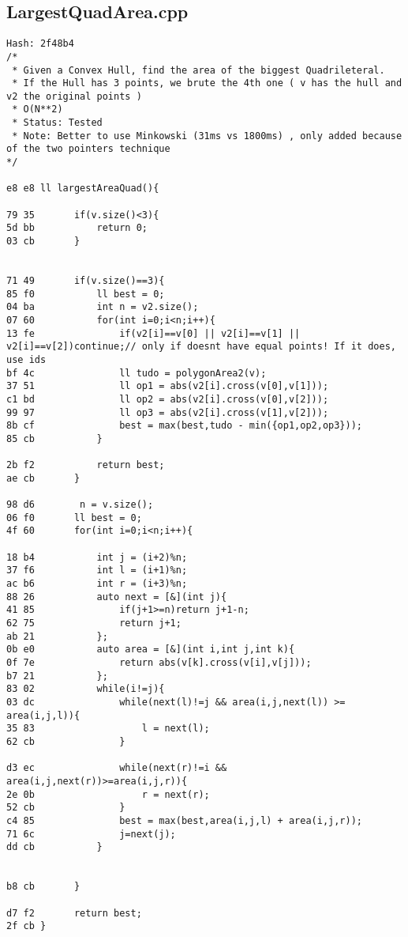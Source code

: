 \documentclass[11pt, a4paper, twoside]{article}
\begin{document}
\subsection{LargestQuadArea.cpp}
\begin{lstlisting}
Hash: 2f48b4
/*
 * Given a Convex Hull, find the area of the biggest Quadrileteral.
 * If the Hull has 3 points, we brute the 4th one ( v has the hull and v2 the original points )
 * O(N**2)
 * Status: Tested
 * Note: Better to use Minkowski (31ms vs 1800ms) , only added because of the two pointers technique 
*/

e8 e8 ll largestAreaQuad(){
      	
79 35 		if(v.size()<3){
5d bb 			return 0;
03 cb 		}
      		
      		
71 49 		if(v.size()==3){
85 f0 			ll best = 0;
04 ba 			int n = v2.size();
07 60 			for(int i=0;i<n;i++){
13 fe 				if(v2[i]==v[0] || v2[i]==v[1] || v2[i]==v[2])continue;// only if doesnt have equal points! If it does, use ids
bf 4c 				ll tudo = polygonArea2(v);
37 51 				ll op1 = abs(v2[i].cross(v[0],v[1]));
c1 bd 				ll op2 = abs(v2[i].cross(v[0],v[2]));
99 97 				ll op3 = abs(v2[i].cross(v[1],v[2]));
8b cf 				best = max(best,tudo - min({op1,op2,op3}));
85 cb 			}
      
2b f2 			return best;
ae cb 		}
      		
98 d6 		 n = v.size();
06 f0 		ll best = 0;	
4f 60 		for(int i=0;i<n;i++){
      
18 b4 			int j = (i+2)%n;
37 f6 			int l = (i+1)%n;
ac b6 			int r = (i+3)%n;
88 26 			auto next = [&](int j){
41 85 				if(j+1>=n)return j+1-n;
62 75 				return j+1;
ab 21 			};
0b e0 			auto area = [&](int i,int j,int k){
0f 7e 				return abs(v[k].cross(v[i],v[j]));
b7 21 			};
83 02 			while(i!=j){
03 dc 				while(next(l)!=j && area(i,j,next(l)) >= area(i,j,l)){
35 83 					l = next(l);
62 cb 				}
      				
d3 ec 				while(next(r)!=i && area(i,j,next(r))>=area(i,j,r)){
2e 0b 					r =	next(r);
52 cb 				}
c4 85 				best = max(best,area(i,j,l) + area(i,j,r));
71 6c 				j=next(j);
dd cb 			}
      
      
b8 cb 		}
      
d7 f2 		return best;
2f cb }
\end{lstlisting}
\end{document}
